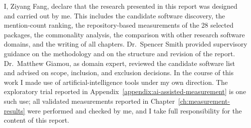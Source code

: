 
I, Ziyang Fang, declare that the research presented in this report was designed
and carried out by me. This includes the candidate software discovery, the
mention-count ranking, the repository-based measurements of the 28 selected
packages, the commonality analysis, the comparison with other research software
domains, and the writing of all chapters. Dr.~Spencer Smith provided
supervisory guidance on the methodology and on the structure and revision of
the report. Dr.~Matthew Giamou, as domain expert, reviewed the candidate
software list and advised on scope, inclusion, and exclusion decisions. In the course of this work I made use of artificial-intelligence
tools under my own direction. The exploratory trial reported in
Appendix~\ref{appendix:ai-assisted-measurement} is one such use; all validated
measurements reported in Chapter~\ref{ch:measurement-results} were performed
and checked by me, and I take full responsibility for the content of this
report.
